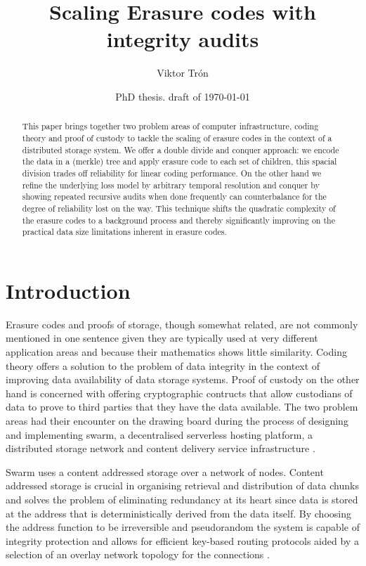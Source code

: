 \documentclass[12pt]{article}
\title{Scaling Erasure codes with integrity audits}
\author{Viktor Trón}
\date{PhD thesis. draft of \today} %
\begin{document}
\maketitle
\tableofcontents

\begin{abstract}
This paper brings together two problem areas of computer infrastructure, coding theory and proof of custody to tackle the scaling of erasure codes in the context of a distributed storage system. We offer a double divide and conquer approach: we encode the data in a (merkle) tree and apply erasure code to each set of children, this spacial division trades off reliability for linear coding performance. On the other hand we refine the underlying loss model by arbitrary temporal resolution and conquer by showing repeated recursive audits when done frequently can counterbalance for the degree of reliability lost on the way. This technique shifts the quadratic complexity of the erasure codes to a background process and thereby significantly improving on the practical data size limitations inherent in erasure codes.
\end{abstract}

\section{Introduction}

Erasure codes and proofs of storage, though somewhat related, are not commonly mentioned in one sentence given they are typically used at very different application areas and because their mathematics shows little similarity. Coding theory offers a solution to the problem of data integrity in the context of improving data availability of data storage systems. Proof of custody on the other hand is concerned with offering cryptographic contructs that allow custodians of data to prove to third parties that they have the data available.
The two problem areas had their encounter on the drawing board during the process of designing and implementing swarm, a decentralised serverless hosting platform, a distributed storage network and  content delivery service infrastructure \cite{ethersphere2016sw3}.

Swarm uses a content addressed storage over a network of nodes. Content addressed storage is crucial in organising retrieval and distribution of data chunks and solves the problem of eliminating redundancy at its heart since data is stored at the address that is deterministically derived from the data itself. By choosing the address function to be irreversible and pseudorandom the system is capable of integrity protection and allows for efficient key-based routing protocols aided by a selection of an overlay network topology for the connections \cite{maymounkov2002kademlia}.
\end{document}
